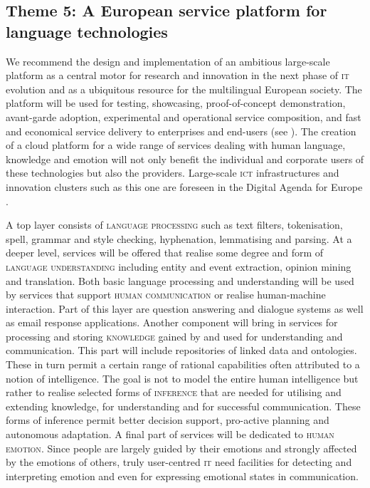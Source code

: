 \documentclass[output=paper]{LSP/langsci}
\begin{document}
\subsection{Theme 5: A European service platform for language technologies}
\label{sec:europ-service-platform}

We recommend the design and implementation of an ambitious large-scale
platform as a central motor for research and innovation in the next
phase of \textsc{it} evolution and as a ubiquitous resource for the
multilingual European society. The platform will be used for testing,
showcasing, proof-of-concept demonstration, avant-garde adoption,
experimental and operational service composition, and fast and
economical service delivery to enterprises and end-users (see
). The creation of a cloud platform
for a wide range of services dealing with human language, knowledge
and emotion will not only benefit the individual and corporate users
of these technologies but also the providers. Large-scale \textsc{ict}
infrastructures and innovation clusters such as this one are foreseen
in the Digital Agenda for Europe \citep[24]{DA2010}.

A top layer consists of \textsc{language processing} such as text
filters, tokenisation, spell, grammar and style checking, hyphenation,
lemmatising and parsing. At a deeper level, services will be offered
that realise some degree and form of \textsc{language understanding}
including entity and event extraction, opinion mining and
translation. Both basic language processing and understanding will be
used by services that support \textsc{human communication} or realise
human-machine interaction. Part of this layer are question answering
and dialogue systems as well as email response applications. Another
component will bring in services for processing and storing
\textsc{knowledge} gained by and used for understanding and
communication. This part will include repositories of linked data and
ontologies. These in turn permit a certain range of rational
capabilities often attributed to a notion of intelligence. The goal is
not to model the entire human intelligence but rather to realise
selected forms of \textsc{inference} that are needed for utilising and
extending knowledge, for understanding and for successful
communication. These forms of inference permit better decision
support, pro-active planning and autonomous adaptation. A final part
of services will be dedicated to \textsc{human emotion}. Since people
are largely guided by their emotions and strongly affected by the
emotions of others, truly user-centred \textsc{it} need facilities for
detecting and interpreting emotion and even for expressing emotional
states in communication.
\end{document}
